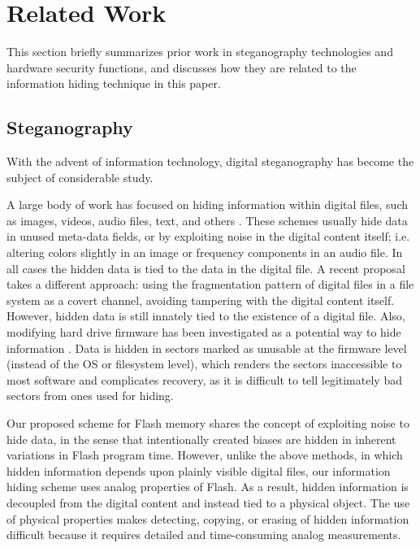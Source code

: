 \section{Related Work} \label{sec:relatedwork} This section
briefly summarizes prior work in steganography technologies and
hardware security functions, and discusses how they are related
to the information hiding technique in this paper.


\subsection{Steganography}

With the advent of information technology, digital steganography
has become the subject of considerable study.

A large body of 
work has focused on hiding information within digital
files, such as images, videos, audio files, text, and others
\cite{digitalsurvey2010,stegintro2003,infohidingsurvey}. 
These schemes usually hide data in unused meta-data fields, or 
by exploiting noise in the digital content itself; i.e. altering
colors slightly in an image or frequency components in an
audio file. In all cases the hidden data is tied
to the data in the digital file. A recent proposal \cite{Khan2011}
takes a different approach: using the fragmentation pattern 
of digital files in a file system as a covert channel, 
avoiding tampering with the digital content itself. However, 
hidden data is still innately tied to the existence of a digital
file. Also, modifying
hard drive firmware has been investigated as a potential way to
hide information \cite{harddisksteganography}. Data is hidden in
sectors marked as unusable at the firmware level (instead of the
OS or filesystem level), which renders the sectors inaccessible
to most software and complicates recovery, as it is difficult to
tell legitimately bad sectors from ones used for hiding.

Our proposed scheme for Flash memory shares the concept of exploiting
noise to hide data, in the sense that intentionally created biases
are hidden in inherent variations in Flash program time.
However, unlike the above methods, in which hidden 
information depends upon plainly visible digital files, our 
information hiding scheme uses analog properties of Flash. 
As a result, hidden information
is decoupled from the digital content and instead tied to a
physical object. The use of physical properties makes detecting,
copying, or erasing of hidden information difficult because it
requires detailed and time-consuming analog measurements.

